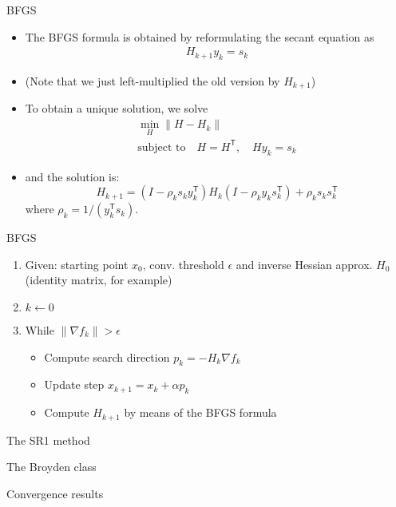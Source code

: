 \documentclass{beamer}
\newcommand{\tran}{\mathsf{T}}
\begin{document}
\begin{frame}[allowframebreaks]{BFGS}
	\newpage
	
	\begin{itemize}
		\item The BFGS formula is obtained by reformulating the secant equation as
		\begin{gather}
		H_{k+1} y_k = s_k
		\end{gather}
		\item (Note that we just left-multiplied the old version by $H_{k+1}$)
		\item To obtain a unique solution, we solve
		\begin{subequations}
			\begin{gather}
			\min_H \| H- H_k \|\\
			\text{subject to}\quad H=H^\tran,\quad H y_k = s_k
			\end{gather}
		\end{subequations}
		\item and the solution is:
		\begin{equation}
		H_{k+1} = (I-\rho_k s_k y_k^\tran) H_k (I - \rho_k y_k s_k^\tran) + \rho_k s_k s_k^\tran
		\end{equation}
		where $\rho_k = 1/(y_k^\tran s_k)$.
	\end{itemize}

	\newpage
	
	\begin{block}{BFGS}
		\begin{enumerate}
			\item Given: starting point $x_0$, conv. threshold $\epsilon$ and inverse Hessian approx. $H_0$ (identity matrix, for example)
			\item $k \leftarrow 0$
			\item While $\| \nabla f_k \| > \epsilon$
			\begin{itemize}
				\item Compute search direction $p_k = -H_k \nabla f_k$
				\item Update step $x_{k+1} = x_k + \alpha p_k$
				\item Compute $H_{k+1}$ by means of the BFGS formula
			\end{itemize}
		\end{enumerate}
	\end{block}

\end{frame}

\begin{frame}[allowframebreaks]{The SR1 method}
\end{frame}

\begin{frame}[allowframebreaks]{The Broyden class}
\end{frame}

\begin{frame}[allowframebreaks]{Convergence results}
\end{frame}
\end{document}
